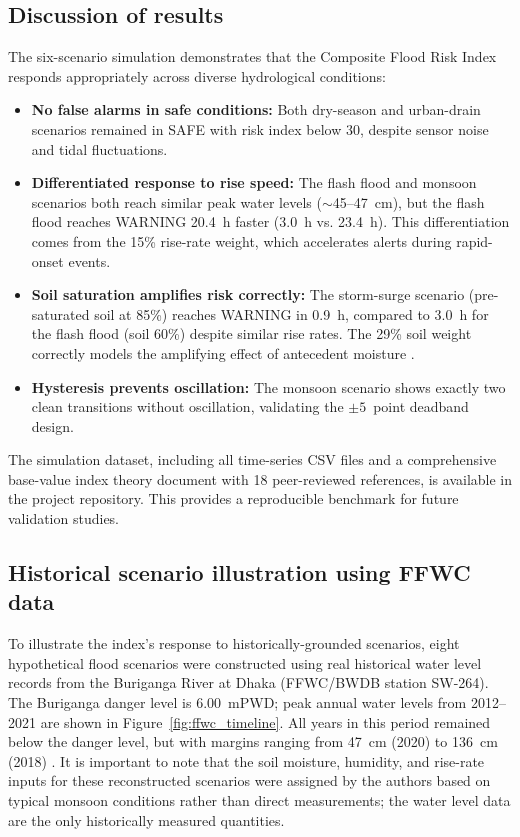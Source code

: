 \documentclass[5p,twocolumn]{elsarticle}
\begin{document}
\subsection{Discussion of results}

The six-scenario simulation demonstrates that the Composite Flood Risk Index responds appropriately across diverse hydrological conditions:

\begin{itemize}[nosep]
  \item \textbf{No false alarms in safe conditions:} Both dry-season and urban-drain scenarios remained in SAFE with risk index below 30, despite sensor noise and tidal fluctuations.
  \item \textbf{Differentiated response to rise speed:} The flash flood and monsoon scenarios both reach similar peak water levels ($\sim$45--47~cm), but the flash flood reaches WARNING 20.4~h faster (3.0~h vs. 23.4~h). This differentiation comes from the 15\% rise-rate weight, which accelerates alerts during rapid-onset events.
  \item \textbf{Soil saturation amplifies risk correctly:} The storm-surge scenario (pre-saturated soil at 85\%) reaches WARNING in 0.9~h, compared to 3.0~h for the flash flood (soil 60\%) despite similar rise rates. The 29\% soil weight correctly models the amplifying effect of antecedent moisture \cite{usda2004,tangdamrongsub2021}.
  \item \textbf{Hysteresis prevents oscillation:} The monsoon scenario shows exactly two clean transitions without oscillation, validating the $\pm5$~point deadband design.
\end{itemize}

The simulation dataset, including all time-series CSV files and a comprehensive base-value index theory document with 18 peer-reviewed references, is available in the project repository. This provides a reproducible benchmark for future validation studies.


\subsection{Historical scenario illustration using FFWC data}

To illustrate the index's response to historically-grounded scenarios, eight hypothetical flood scenarios were constructed using real historical water level records from the Buriganga River at Dhaka (FFWC/BWDB station SW-264). The Buriganga danger level is 6.00~mPWD; peak annual water levels from 2012--2021 are shown in Figure~\ref{fig:ffwc_timeline}. All years in this period remained below the danger level, but with margins ranging from 47~cm (2020) to 136~cm (2018) \cite{ffwc2012,ffwc2013,ffwc2014,ffwc2015,ffwc2016,ffwc2017,ffwc2018,ffwc2019,ffwc2020,ffwc2021}. It is important to note that the soil moisture, humidity, and rise-rate inputs for these reconstructed scenarios were assigned by the authors based on typical monsoon conditions rather than direct measurements; the water level data are the only historically measured quantities.
\end{document}

